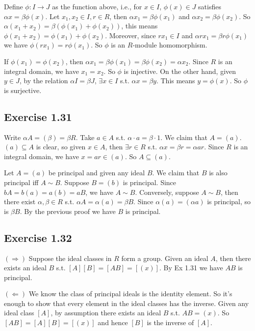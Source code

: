 \documentclass[../Marcus.tex]{subfiles}
\begin{document}
Define $\phi:I\to J$ as the function above, i.e., for $x\in I$, $\phi(x)\in J$ satisfies $\alpha x=\beta\phi(x)$. Let $x_1,x_2\in I,r\in R$, then $\alpha x_1=\beta\phi(x_1)$ and $\alpha x_2=\beta\phi(x_2)$. So $\alpha(x_1+x_2)=\beta(\phi(x_1)+\phi(x_2))$, this means $\phi(x_1+x_2)=\phi(x_1)+\phi(x_2)$. Moreover, since $rx_1\in I$ and $\alpha rx_1=\beta r\phi(x_1)$ we have $\phi(rx_1)=r\phi(x_1)$. So $\phi$ is an $R$-module homomorphism.

If $\phi(x_1)=\phi(x_2)$, then $\alpha x_1=\beta\phi(x_1)=\beta\phi(x_2)=\alpha x_2$. Since $R$ is an integral domain, we have $x_1=x_2$. So $\phi$ is injective. On the other hand, given $y\in J$, by the relation $\alpha I=\beta J$, $\exists x\in I$ s.t. $\alpha x=\beta y$. This means $y=\phi(x)$. So $\phi$ is surjective.

\subsection*{Exercise 1.31}

Write $\alpha A=(\beta)=\beta R$. Take $a\in A$ s.t. $\alpha\cdot a=\beta\cdot 1$. We claim that $A=(a)$. $(a)\subseteq A$ is clear, so given $x\in A$, then $\exists r\in R$ s.t. $\alpha x=\beta r=\alpha ar$. Since $R$ is an integral domain, we have $x=ar\in (a)$. So $A\subseteq (a)$. 

Let $A=(a)$ be principal and given any ideal $B$. We claim that $B$ is also principal iff $A\sim B$. Suppose $B=(b)$ is principal. Since $bA=b(a)=a(b)=aB$, we have $A\sim B$. Conversely, suppose $A\sim B$, then there exist $\alpha,\beta\in R$ s.t. $\alpha A=\alpha(a)=\beta B$. Since $\alpha(a)=(\alpha a)$ is principal, so is $\beta B$. By the previous proof we have $B$ is principal.

\subsection*{Exercise 1.32}

$(\Rightarrow)$ Suppose the ideal classes in $R$ form a group. Given an ideal $A$, then there exists an ideal $B$ s.t. $[A][B]=[AB]=[(x)]$. By Ex 1.31 we have $AB$ is principal.

$(\Leftarrow)$ We know the class of principal ideals is the identity element. So it's enough to show that every element in the ideal classes has the inverse. Given any ideal class $[A]$, by assumption there exists an ideal $B$ s.t. $AB=(x)$. So $[AB]=[A][B]=[(x)]$ and hence $[B]$ is the inverse of $[A]$.
\end{document}
